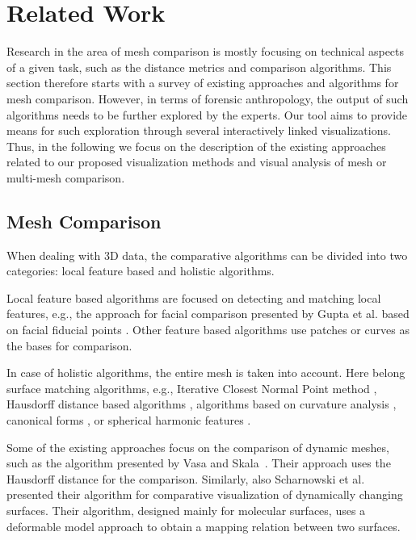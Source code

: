 \documentclass[final,5p,times]{elsarticle}
\begin{document}

\section{Related Work} \label{related}
Research in the area of mesh comparison is mostly focusing on technical aspects of a given task, such as the distance metrics and comparison algorithms.
This section therefore starts with a survey of existing approaches and algorithms for mesh comparison.
However, in terms of forensic anthropology, the output of such algorithms needs to be further explored by the experts.
Our tool aims to provide means for such exploration through several interactively linked visualizations.
Thus, in the following we focus on the description of the existing approaches related to our proposed visualization methods and visual analysis of mesh or multi-mesh comparison.

\subsection{Mesh Comparison}
When dealing with 3D data, the comparative algorithms can be divided into two categories: local feature based and holistic algorithms.

Local feature based algorithms are focused on detecting and matching local features, e.g., the approach for facial comparison presented by Gupta et al. based on facial fiducial points \cite{gupta2010anthropometric}. 
Other feature based algorithms use patches \cite{guo2016ei3d,chua20003d} or curves \cite{bronstein2005three} as the bases for comparison. 

In case of holistic algorithms, the entire mesh is taken into account.
Here belong surface matching algorithms, e.g., Iterative Closest Normal Point method \cite{mohammadzade2013iterative}, Hausdorff distance based algorithms \cite{huttenlocher1993comparing,pan2003automatic}, algorithms based on curvature analysis \cite{lei20093d,tanaka1998curvature}, canonical forms \cite{bronstein2007expression}, or spherical harmonic features \cite{liu2013learning}.

Some of the existing approaches focus on the comparison of dynamic meshes, such as the algorithm presented by Vasa and Skala~\cite{Vasa2006}.
Their approach uses the Hausdorff distance for the comparison.
Similarly, also Scharnowski et al.~\cite{Scharnowski2014} presented their algorithm for comparative visualization of dynamically changing surfaces.
Their algorithm, designed mainly for molecular surfaces, uses a deformable model approach to obtain a mapping relation between two surfaces.
\end{document}
